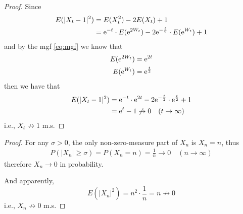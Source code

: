 \documentclass{homework}
\begin{document}
\begin{subproblem}
        \item
        \begin{proof}
            Since
            \[\begin{aligned}
                E(|X_t-1|^2)&=E(X_t^2)-2E(X_t)+1\\
                &=\mathrm e^{-t}\cdot E(\mathrm e^{2W_t})
                  -2\mathrm e^{-\frac t2}\cdot E(\mathrm e^{W_t})+1
            \end{aligned}\]
            and by the mgf \cref{eq:mgf} we know that
            \[\begin{aligned}
                E(\mathrm e^{2W_t})&=\mathrm e^{2t}\\
                E(\mathrm e^{W_t})&=\mathrm e^{\frac t2}\\
            \end{aligned}\]
            then we have that
            \[\begin{aligned}
                E(|X_t-1|^2)&=\mathrm e^{-t}\cdot\mathrm e^{2t}
                -2\mathrm e^{-\frac t2}\cdot\mathrm e^{\frac t2}+1\\
                &=\mathrm e^t-1\not\to 0\quad(t\to\infty)
            \end{aligned}\]
            i.e., $X_t\not\to 1$ m.s.
        \end{proof}

        \item

        \item
        \begin{proof}
            For any $\sigma>0$, the only non-zero-measure part
            of $X_n$ is $X_n=n$, thus
            \[\begin{aligned}
                P(|X_n|\geq\sigma)=P(X_n=n)=\frac{1}{n}\to 0
                \quad(n\to\infty)
            \end{aligned}\]
            therefore $X_n\to 0$ in probability.

            And apparently,
            \[E(|X_n|^2)=n^2\cdot\frac{1}{n}=n\not\to 0\]
            i.e., $X_n\not\to 0$ m.s.
        \end{proof}

        \item


\end{subproblem}
\end{document}
